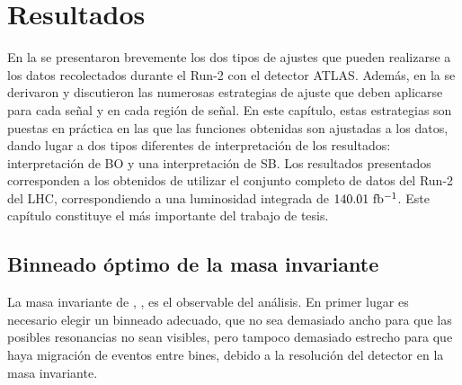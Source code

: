 \chapter{Resultados}
\label{ch:results}


En la \Sect{\ref{sec:strategy:strategy}} se presentaron brevemente los dos tipos de ajustes que pueden realizarse a los datos recolectados durante el Run-2 con el detector \ac{ATLAS}. Además, en la \Sect{\ref{sec:bkg:modeling}} se derivaron y discutieron las numerosas estrategias de ajuste que deben aplicarse para cada señal y en cada región de señal. En este capítulo, estas estrategias son puestas en práctica en las que las funciones obtenidas son ajustadas a los datos, dando lugar a dos tipos diferentes de interpretación de los resultados: interpretación de \ac{BO} y una interpretación de \ac{SB}. Los resultados presentados corresponden a los obtenidos de utilizar el conjunto completo de datos del Run-2 del \ac{LHC}, correspondiendo a una luminosidad integrada de \(140.01~\ifb\). Este capítulo constituye el más importante del trabajo de tesis.














\section{Binneado óptimo de la masa invariante}
\label{sec:results:obs}


La masa invariante de \gammajet, \myj, es el observable del análisis. En primer lugar es necesario elegir un binneado adecuado, que no sea demasiado ancho para que las posibles resonancias no sean visibles, pero tampoco demasiado estrecho para que haya migración de eventos entre bines, debido a la resolución del detector en la masa invariante.

